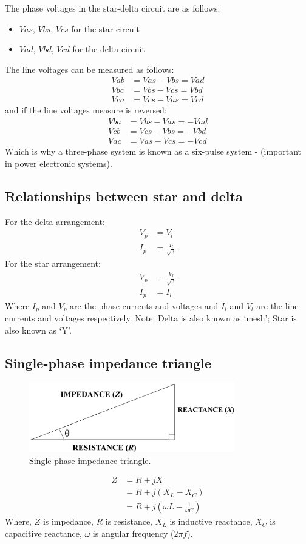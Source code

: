 \documentclass[class=report, crop=false, 12pt,a4paper]{standalone}
\begin{document}
The phase voltages in the star-delta circuit are as follows:
\begin{itemize}
	\item $Vas$, $Vbs$, $Vcs$ for the star circuit
	\item $Vad$, $Vbd$, $Vcd$ for the delta circuit
\end{itemize}
The line voltages can be measured as follows:
\begin{align}
	Vab &= Vas - Vbs = Vad\\
	Vbc &= Vbs - Vcs = Vbd\\
	Vca &= Vcs - Vas = Vcd
\end{align}
and if the line voltages measure is reversed:
\begin{align}
	Vba &= Vbs - Vas = -Vad\\
	Vcb &= Vcs - Vbs = -Vbd\\
	Vac &= Vas - Vcs = -Vcd
\end{align}
Which is why a three-phase system is known as a six-pulse system - (important in power electronic systems).
\subsection{Relationships between star and delta}
For the delta arrangement:
\begin{align}
	V_p &= V_l\\
	I_p &= \frac{I_l}{\sqrt{3}}
\end{align}
For the star arrangement:
\begin{align}
	V_p &= \frac{V_l}{\sqrt{3}}\\
	I_p &= I_l
\end{align}
Where $I_p$ and $V_p$ are the phase currents and voltages and $I_l$ and $V_l$ are the line currents and voltages respectively. Note: Delta is also known as `mesh'; Star is also known as `Y'.
\subsection{Single-phase impedance triangle}
\begin{figure}[H]
	\centering
	\includegraphics[width = 0.8\textwidth]{../img/figure9.png}
	\caption{Single-phase impedance triangle.}
\end{figure}
\begin{align}
	Z &= R + jX\\
	&= R + j\left(X_L - X_C\right)\\
	&= R + j\left(\omega L - \frac{1}{\omega C}\right)
\end{align}
Where, $Z$ is impedance, $R$ is resistance, $X_L$ is inductive reactance, $X_C$ is capacitive reactance, $\omega$ is angular frequency ($2\pi f$).
\end{document}
